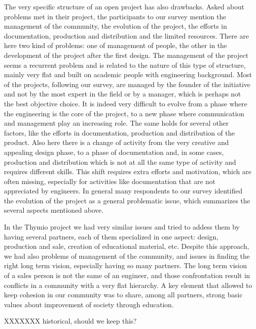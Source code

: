 \documentclass[letterpaper, 10 pt, conference]{ieeeconf}  %
\begin{document}
The very specific structure of an open project has also drawbacks. 
Asked about problems met in their project, the participants to our survey mention the management of the community, the evolution of the project, the efforts in documentation, production and distribution and the limited resources.
There are here two kind of problems: one of management of people, the other in the development of the project after the first design.
The management of the project seems a recurrent problem and is related to the nature of this type of structure, mainly very flat and built on academic people with engineering background. 
Most of the projects, following our survey, are managed by the founder of the initiative and not by the most expert in the field or by a manager, which is perhaps not the best objective choice.
It is indeed very difficult to evolve from a phase where the engineering is the core of the project, to a new phase where communication and management play an increasing role.
The same holds for several other factors, like the efforts in documentation, production and distribution of the product. 
Also here there is a change of activity from the very creative and appealing design phase, to a phase of documentation and, in some cases, production and distribution which is not at all the same type of activity and requires different skills.
This shift requires extra efforts and motivation, which are often missing, especially for activities like documentation that are not appreciated by engineers.
In general many respondents to our survey identified the evolution of the project as a general problematic issue, which summarizes the several aspects mentioned above.

In the Thymio project we had very similar issues and tried to addess them by having several partners, each of them specialized in one aspect: design, production and sale, creation of educational material, etc.
Despite this approach, we had also problems of management of the community, and issues in finding the right long term vision, especially having so many partners. 
The long term vision of a sales person is not the same of an engineer, and those confrontation result in conflicts in a community with a very flat hierarchy. 
A key element that allowed to keep cohesion in our community was to share, among all partners, strong basic values about improvement of society through education.

XXXXXXX historical, should we keep this?
\end{document}
